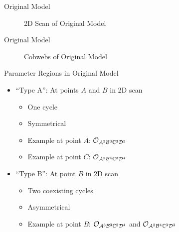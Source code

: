 \begin{frame}{Original Model}
    \vspace{-2.0em}
    \begin{figure}
        \centering
        \caption{2D Scan of Original Model}
    \end{figure}
\end{frame}

\begin{frame}{Original Model}
    \vspace{-3.0em}
    \begin{figure}
        \centering
        \caption{Cobwebs of Original Model}
    \end{figure}
\end{frame}

\begin{frame}{Parameter Regions in Original Model}
    \begin{itemize}
        \item ``Type A'': At points $A$ and $B$ in 2D scan
              \begin{itemize}
                  \item One cycle
                  \item Symmetrical
                  \item Example at point $A$: $\mathcal{O}_{\mathcal{A}^3\mathcal{B}^3\mathbb{C}^3\mathcal{D}^3}$
                  \item Example at point $C$: $\mathcal{O}_{\mathcal{A}^2\mathcal{B}^4\mathbb{C}^2\mathcal{D}^4}$ \vspace*{1em}
              \end{itemize}
        \item ``Type B'': At point $B$ in 2D scan
              \begin{itemize}
                  \item Two coexisting cycles
                  \item Asymmetrical
                  \item Example at point $B$: $\mathcal{O}_{\mathcal{A}^3\mathcal{B}^3\mathbb{C}^2\mathcal{D}^4}$ and $\mathcal{O}_{\mathcal{A}^2\mathcal{B}^4\mathbb{C}^3\mathcal{D}^3}$
              \end{itemize}
    \end{itemize}
\end{frame}


